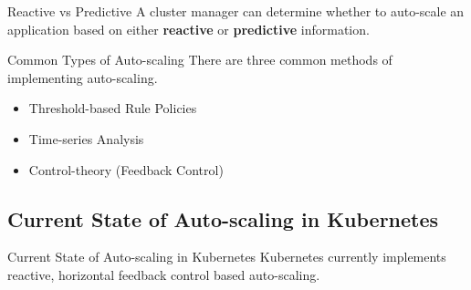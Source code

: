 \documentclass{beamer}
\begin{document}
\begin{frame}{Reactive vs Predictive}
  A cluster manager can determine whether to auto-scale an application based on
  either \textbf{reactive} or \textbf{predictive} information.

\end{frame}

\begin{frame}{Common Types of Auto-scaling}
  There are three common methods of implementing auto-scaling.

  \begin{itemize}
    \item Threshold-based Rule Policies
    \item Time-series Analysis
    \item Control-theory (Feedback Control)
  \end{itemize}
\end{frame}

\subsection{Current State of Auto-scaling in Kubernetes}

\begin{frame}{Current State of Auto-scaling in Kubernetes}
  Kubernetes currently implements reactive, horizontal feedback control based
  auto-scaling.


\end{frame}
\end{document}
